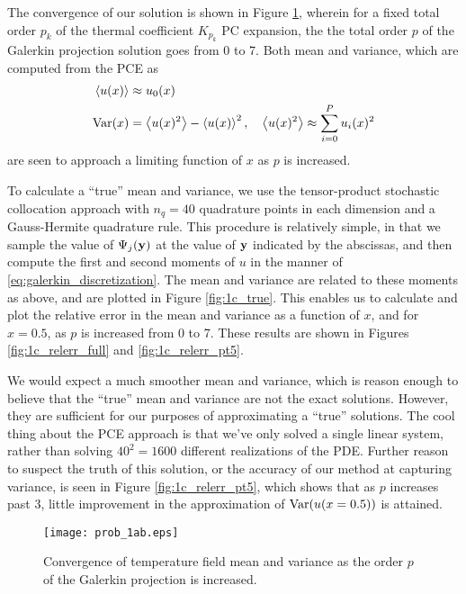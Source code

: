 \documentclass[11pt]{article}
\begin{document}
The convergence of our solution is shown in Figure \ref{fig:1ab}, wherein for a fixed total order $p_k$ of the thermal coefficient $K_{p_k}$ PC expansion, the the total order $p$ of the Galerkin projection solution goes from 0 to 7. Both mean and variance, which are computed from the PCE as
\begin{equation}
\begin{aligned}
\left\langle u(x) \right\rangle   &\approx u_0(x) \\
\operatorname{Var}(x) &= \left\langle u(x)^2 \right\rangle - \left\langle u(x) \right\rangle^2, \quad
\left\langle u(x)^2 \right\rangle \approx \sum_{i=0}^P u_i(x)^2
\end{aligned}
\end{equation}
are seen to approach a limiting function of $x$ as $p$ is increased.

To calculate a ``true'' mean and variance, we use the tensor-product stochastic collocation approach with $n_q=40$ quadrature points in each dimension and a Gauss-Hermite quadrature rule. This procedure is relatively simple, in that we sample the value of $\Psi_j(\mb{y})$ at the value of $\mb{y}$ indicated by the abscissas, and then compute the first and second moments of $u$ in the manner of \eqref{eq:galerkin_discretization}. The mean and variance are related to these moments as above, and are plotted in Figure \ref{fig:1c_true}. This enables us to calculate and plot the relative error in the mean and variance as a function of $x$, and for $x=0.5$, as $p$ is increased from 0 to 7. These results are shown in Figures \ref{fig:1c_relerr_full} and \ref{fig:1c_relerr_pt5}.

We would expect a much smoother mean and variance, which is reason enough to believe that the ``true'' mean and variance are not the exact solutions. However, they are sufficient for our purposes of approximating a ``true'' solutions. The cool thing about the PCE approach is that we've only solved a single linear system, rather than solving $40^2 = 1600$ different realizations of the PDE. Further reason to suspect the truth of this solution, or the accuracy of our method at capturing variance, is seen in Figure \ref{fig:1c_relerr_pt5}, which shows that as $p$ increases past 3, little improvement in the approximation of $\operatorname{Var}(u(x=0.5))$ is attained.

\begin{figure}[p]
\centering
\texttt{[image: prob\_1ab.eps]}
\caption{Convergence of temperature field mean and variance as the order $p$ of the Galerkin projection is increased.}
\label{fig:1ab}
\end{figure}
\end{document}
